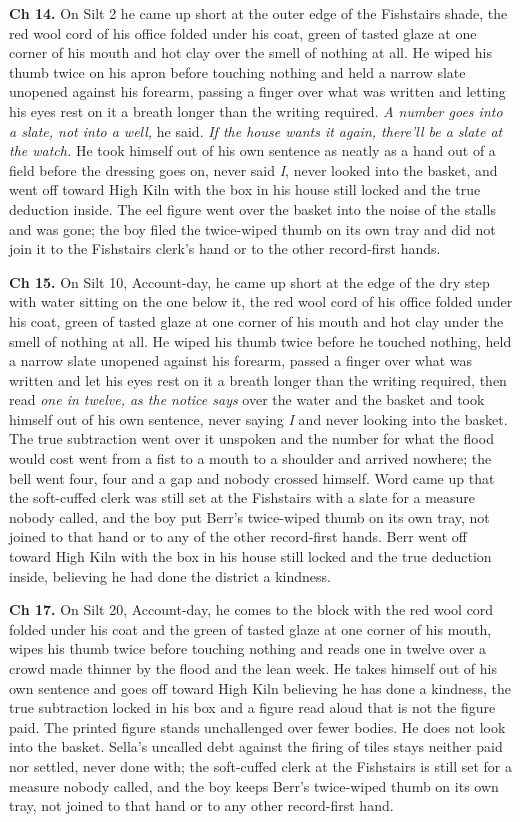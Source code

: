 \documentclass{design/chronicle}
\begin{document}
{\textbf{Ch 14.} On Silt 2 he came up short at the outer edge of the Fishstairs shade, the red wool cord of his office folded under his coat, green of tasted glaze at one corner of his mouth and hot clay over the smell of nothing at all. He wiped his thumb twice on his apron before touching nothing and held a narrow slate unopened against his forearm, passing a finger over what was written and letting his eyes rest on it a breath longer than the writing required. \emph{A number goes into a slate, not into a well,} he said. \emph{If the house wants it again, there’ll be a slate at the watch.} He took himself out of his own sentence as neatly as a hand out of a field before the dressing goes on, never said \emph{I}, never looked into the basket, and went off toward High Kiln with the box in his house still locked and the true deduction inside. The eel figure went over the basket into the noise of the stalls and was gone; the boy filed the twice-wiped thumb on its own tray and did not join it to the Fishstairs clerk’s hand or to the other record-first hands.

\textbf{Ch 15.} On Silt 10, Account-day, he came up short at the edge of the dry step with water sitting on the one below it, the red wool cord of his office folded under his coat, green of tasted glaze at one corner of his mouth and hot clay under the smell of nothing at all. He wiped his thumb twice before he touched nothing, held a narrow slate unopened against his forearm, passed a finger over what was written and let his eyes rest on it a breath longer than the writing required, then read \emph{one in twelve, as the notice says} over the water and the basket and took himself out of his own sentence, never saying \emph{I} and never looking into the basket. The true subtraction went over it unspoken and the number for what the flood would cost went from a fist to a mouth to a shoulder and arrived nowhere; the bell went four, four and a gap and nobody crossed himself. Word came up that the soft-cuffed clerk was still set at the Fishstairs with a slate for a measure nobody called, and the boy put Berr’s twice-wiped thumb on its own tray, not joined to that hand or to any of the other record-first hands. Berr went off toward High Kiln with the box in his house still locked and the true deduction inside, believing he had done the district a kindness.

\textbf{Ch 17.} On Silt 20, Account-day, he comes to the block with the red wool cord folded under his coat and the green of tasted glaze at one corner of his mouth, wipes his thumb twice before touching nothing and reads one in twelve over a crowd made thinner by the flood and the lean week. He takes himself out of his own sentence and goes off toward High Kiln believing he has done a kindness, the true subtraction locked in his box and a figure read aloud that is not the figure paid. The printed figure stands unchallenged over fewer bodies. He does not look into the basket. Sella’s uncalled debt against the firing of tiles stays neither paid nor settled, never done with; the soft-cuffed clerk at the Fishstairs is still set for a measure nobody called, and the boy keeps Berr’s twice-wiped thumb on its own tray, not joined to that hand or to any other record-first hand.

}
\end{document}
